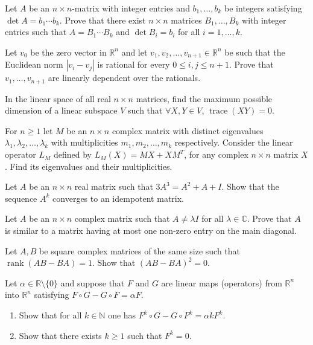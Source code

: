 \documentclass[12pt]{article}
\begin{document}
\begin{problems}
\item Let $A$ be an $n\times n$-matrix with integer entries and $b_1,\dots,b_k$ be integers satisfying $\det A = b_1\cdots b_k$. Prove that there exist $n\times n$ matrices $B_1,\dots,B_k$ with integer entries such that $A=B_1\cdots B_k$ and $\det B_i = b_i$ for all $i=1,\dots,k$.

\item Let $v_0$ be the zero vector in $\mathbb{R}^n$ and let $v_1,v_2,\dots,v_{n+1}\in\mathbb{R}^n$ be such that the Euclidean norm $|v_i-v_j|$ is rational for every $0\le i,j\le n+1$. Prove that $v_1,\dots,v_{n+1}$ are linearly dependent over the rationals.

\item In the linear space of all real $n\times n$ matrices, find the maximum possible dimension of a linear subspace $V$ such that $\forall X,Y\in V$, $\operatorname{trace}(XY)=0$.

\item For $n\ge 1$ let $M$ be an $n\times n$ complex matrix with distinct eigenvalues $\lambda_1,\lambda_2,\dots,\lambda_k$ with multiplicities $m_1,m_2,\dots,m_k$ respectively. Consider the linear operator $L_M$ defined by $L_M(X)=MX+XM^T$, for any complex $n\times n$ matrix $X$. Find its eigenvalues and their multiplicities.

\item Let $A$ be an $n\times n$ real matrix such that $3A^3 = A^2+A+I$. Show that the sequence $A^k$ converges to an idempotent matrix.

\item Let $A$ be an $n\times n$ complex matrix such that $A\ne \lambda I$ for all $\lambda\in\mathbb{C}$. Prove that $A$ is similar to a matrix having at most one non-zero entry on the main diagonal.

\item Let $A,B$ be square complex matrices of the same size such that $\operatorname{rank}(AB-BA)=1$. Show that $(AB-BA)^2=0$.

\item Let $\alpha\in\mathbb{R}\setminus\{0\}$ and suppose that $F$ and $G$ are linear maps (operators) from $\mathbb{R}^n$ into $\mathbb{R}^n$ satisfying $F\circ G - G\circ F = \alpha F$.
\begin{enumerate}[label=(\alph*)]
\item Show that for all $k\in\mathbb{N}$ one has $F^k\circ G - G\circ F^k = \alpha k F^k$.
\item Show that there exists $k\ge 1$ such that $F^k=0$.
\end{enumerate}


\end{problems}
\end{document}
